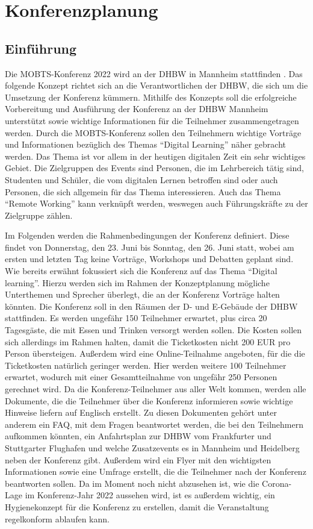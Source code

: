 \chapter{Konferenzplanung}
\section{Einführung}
Die MOBTS-Konferenz 2022 wird an der DHBW in Mannheim stattfinden \autocite[Vgl.][]{MOBTS.04.03.2021}. Das folgende Konzept richtet sich an die Verantwortlichen der DHBW, die sich um die Umsetzung der Konferenz kümmern. Mithilfe des Konzepts soll die erfolgreiche Vorbereitung und Ausführung der Konferenz an der DHBW Mannheim unterstützt sowie wichtige Informationen für die Teilnehmer zusammengetragen werden. Durch die MOBTS-Konferenz sollen den Teilnehmern wichtige Vorträge und Informationen bezüglich des Themas \enquote{Digital Learning} näher gebracht werden. Das Thema ist vor allem in der heutigen digitalen Zeit ein sehr wichtiges Gebiet. Die Zielgruppen des Events sind Personen, die im Lehrbereich tätig sind, Studenten und Schüler, die vom digitalen Lernen betroffen sind oder auch Personen, die sich allgemein für das Thema interessieren. Auch das Thema \enquote{Remote Working} kann verknüpft werden, weswegen auch Führungskräfte zu der Zielgruppe zählen.
 
Im Folgenden werden die Rahmenbedingungen der Konferenz definiert. Diese findet von Donnerstag, den 23. Juni bis Sonntag, den 26. Juni statt, wobei am ersten und letzten Tag keine Vorträge, Workshops und Debatten geplant sind. Wie bereits erwähnt fokussiert sich die Konferenz auf das Thema \enquote{Digital learning}. Hierzu werden sich im Rahmen der Konzeptplanung mögliche Unterthemen und Sprecher überlegt, die an der Konferenz Vorträge halten könnten. Die Konferenz soll in den Räumen der D- und E-Gebäude der DHBW stattfinden. Es werden ungefähr 150 Teilnehmer erwartet, plus circa 20 Tagesgäste, die mit Essen und Trinken versorgt werden sollen. Die Kosten sollen sich allerdings im Rahmen halten, damit die Ticketkosten nicht 200 EUR pro Person übersteigen. Außerdem wird eine Online-Teilnahme angeboten, für die die Ticketkosten natürlich geringer werden. Hier werden weitere 100 Teilnehmer erwartet, wodurch mit einer Gesamtteilnahme von ungefähr 250 Personen gerechnet wird. Da die Konferenz-Teilnehmer aus aller Welt kommen, werden alle Dokumente, die die Teilnehmer über die Konferenz informieren sowie wichtige Hinweise liefern auf Englisch erstellt. Zu diesen Dokumenten gehört unter anderem ein FAQ, mit dem Fragen beantwortet werden, die bei den Teilnehmern aufkommen könnten, ein Anfahrtsplan zur DHBW vom Frankfurter und Stuttgarter Flughafen und welche Zusatzevents es in Mannheim und Heidelberg neben der Konferenz gibt. Außerdem wird ein Flyer mit den wichtigsten Informationen sowie eine Umfrage erstellt, die die Teilnehmer nach der Konferenz beantworten sollen. Da im Moment noch nicht abzusehen ist, wie die Corona-Lage im Konferenz-Jahr 2022 aussehen wird, ist es außerdem wichtig, ein Hygienekonzept für die Konferenz zu erstellen, damit die Veranstaltung regelkonform ablaufen kann.

